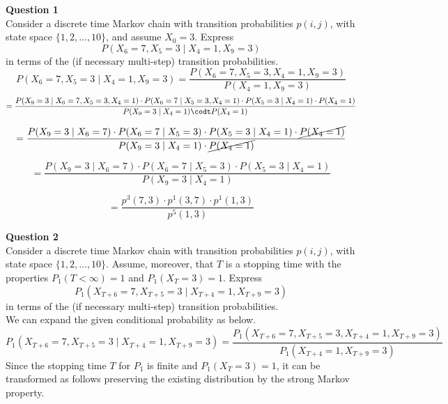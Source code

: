 \documentclass[12pt]{article}
\begin{document}
 


\noindent
\textbf{Question 1}\\
Consider a discrete time Markov chain with transition probabilities $p(i, j)$, with state space
$\{1, 2, . . . , 10\}$, and assume $X_0 = 3$. Express
$$P(X_6 = 7, X_5 = 3\;|\;X_4 = 1, X_9 = 3)$$
in terms of the (if necessary multi-step) transition probabilities.\\

\vspace{1.5\baselineskip}
\noindent
$$P(X_6 = 7, X_5 = 3\;|\;X_4 = 1, X_9 = 3) 
= \frac{P(X_6 = 7, X_5 = 3, X_4 = 1, X_9 = 3)}{P(X_4 = 1, X_9 = 3)}$$
$$
= \frac{P(X_9 = 3\;|\;X_6=7,X_5=3,X_4=1)\cdot P(X_6=7\;|\;X_5=3,X_4=1)\cdot P(X_5=3\;|\;X_4=1)\cdot P(X_4=1)}{P(X_9=3\;|\;X_4=1)\codt P(X_4=1)}$$

$$
= \frac{P(X_9 = 3\;|\;X_6=7)\cdot P(X_6=7\;|\;X_5=3)\cdot P(X_5=3\;|\;X_4=1)\cdot \cancel{P(X_4=1)}}{P(X_9=3\;|\;X_4=1)\cdot \cancel{P(X_4=1)}}$$



$$
= \frac{P(X_9 = 3\;|\;X_6=7)\cdot P(X_6=7\;|\;X_5=3)\cdot P(X_5=3\;|\;X_4=1)}{P(X_9=3\;|\;X_4=1)}$$

$$
=\frac{p^3(7,3)\cdot p^1(3,7)\cdot p^1(1,3)}{p^5(1,3)}
$$



\newpage
\noindent
\textbf{Question 2}\\
Consider a discrete time Markov chain with transition probabilities $p(i, j)$, with state space
$\{1, 2, . . . , 10\}.$ Assume, moreover, that $T$ is a stopping time with the properties $P_1(T<\infty) = 1$ and $P_1(X_T=3) = 1.$ Express
$$P_1(X_{T+6} = 7, X_{T+5} = 3\;|\;X_{T+4} = 1, X_{T+9} = 3)$$
in terms of the (if necessary multi-step) transition probabilities.\\

\vspace{1.5\baselineskip}
\noindent
We can expand the given conditional probability as below.
$$
P_1(X_{T+6} = 7, X_{T+5} = 3\;|\;X_{T+4} = 1, X_{T+9}=3) = 
\frac{P_1(X_{T+6} = 7, X_{T+5} = 3, X_{T+4} = 1, X_{T+9}=3)}{P_1(X_{T+4} = 1, X_{T+9}=3)} 
$$
\noindent
Since the stopping time $T$ for $P_1$ is finite and $P_1(X_T =3) = 1$, it can be transformed as follows preserving the existing distribution by the strong Markov property.
\end{document}
